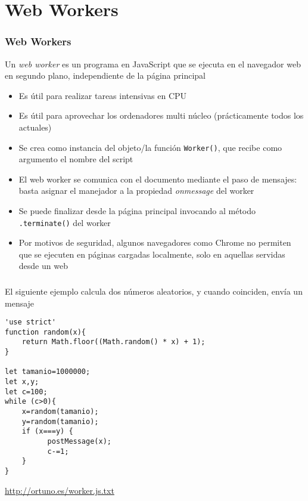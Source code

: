 \documentclass[ucs]{beamer}
\begin{document}
\section{Web Workers}
\begin{frame}[fragile]
\frametitle{Web Workers}
Un
\emph{web worker} es un programa en JavaScript que se ejecuta en el navegador web en segundo plano, independiente
de la página principal


    \begin{itemize}
    \item
Es útil para realizar tareas intensivas en CPU

    \item
Es útil para aprovechar los ordenadores multi núcleo (prácticamente todos los actuales)


    \item
Se crea como instancia del objeto/la función \verb|Worker()|, que recibe
como argumento el nombre del script

    \item
El web worker se comunica con el documento mediante el paso de mensajes:
basta asignar el manejador a la propiedad \emph{onmessage} del worker

    \item
Se puede finalizar desde la página principal invocando al método \verb|.terminate()|
del worker

    \item
Por motivos de seguridad, algunos navegadores como Chrome no permiten que se ejecuten
en páginas cargadas localmente, solo en aquellas servidas desde un web
    \end{itemize}

\end{frame}



\begin{frame}[fragile]
\frametitle{}
El siguiente ejemplo calcula dos números aleatorios, y cuando 
coinciden, envía un mensaje


  \begin{scriptsize}
  \begin{verbatim}
'use strict'
function random(x){
    return Math.floor((Math.random() * x) + 1);
}

let tamanio=1000000;
let x,y;
let c=100;
while (c>0){
    x=random(tamanio);
    y=random(tamanio);
    if (x===y) {
          postMessage(x);
          c-=1;
    }
}
  \end{verbatim}
  \end{scriptsize}
\begin{tiny}
\begin{flushright}
\url{http://ortuno.es/worker.js.txt}
\end{flushright}
\end{tiny}

\end{frame}
\end{document}
